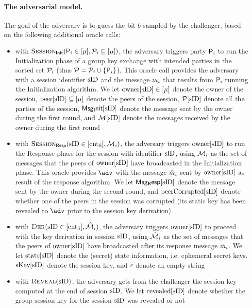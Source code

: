\paragraph{The adversarial model.}
The goal of the adversary is to guess the bit $b$ sampled by the challenger, based on the following additional oracle calls:
\begin{itemize}
	\item with $\GakeIniO ( \GIni  \in [\maxusers], \PartySet_{i} \subseteq [\maxusers])$, the adversary triggers party $\User[i]$ to run the Initialization phase of a group key exchange with intended parties in the sorted set $\PartySet_{i}$ (thus $\PartySet = \PartySet_{i}  \cup \{\User[i]\}$). This oracle call provides the adversary with a session identifier $\sID$ and the message $\GakeIniMes_{i}$ that results from $\User[i]$ running the Initialization algorithm. We let $\owner[\sID] \in [\maxusers]$ denote the owner of the session, $\peer[\sID] \subseteq[\maxusers]$ denote the peers of the session, $\GakeUSet[\sID]$ denote all the parties of the session, $\GIniMes[\sID]$ denote the message sent by the owner during the first round, and $\GIniMesSet[\sID]$ denote the messages received by the owner during the first round
	\item with $\GakeResO(\sID \in [\cntS], \GakeIniMesSet[{i}] )$, the adversary triggers $\owner[\sID]$ to run the Response phase for the session with identifier $\sID$, using $\GakeIniMesSet[i]$ as the set of messages that the peers of $\owner[\sID]$ have broadcasted in the Initialization phase. This oracle provides $\adv$ with the message $\GakeResMes_{i}$ sent by $\owner[\sID]$ as result of the response algorithm. We let $\GResMes[\sID]$ denote the message sent by the owner during the second round, and $\peercorrupted[\sID]$ denote whether one of the peers in the session was corrupted (its static key has been revealed to $\adv$ prior to the session key derivation)
	\item with $\GakeDerO(\GakeResUsID \in [\cntS],  \GakeResMesSet[{i}])$, the adversary triggers $\owner[\sID]$ to proceed with the key derivation in session $\sID$, using $\GakeResMesSet[i]$ as the set of messages that the peers of $\owner[\sID]$ have broadcasted after its response message $\GakeResMes_{i}$. We let $\Gstates[\sID]$ denote the (secret) state information, i.e. ephemeral secret keys, $\ListGakeSessKey[\sID]$ denote the session key, and $\emptystr$ denote an empty string
	\item with $\RevealO(\sID)$, the adversary gets from the challenger the session key computed at the end of session $\sID$. We let $\revealed[\sID]$ denote whether the group session key for the session $\sID$ was revealed or not

\end{itemize}

